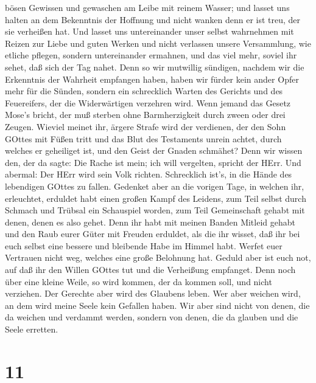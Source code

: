 bösen Gewissen und gewaschen am Leibe mit reinem Wasser; 
und lasset uns halten an dem Bekenntnis der Hoffnung und nicht wanken
denn er ist treu, der sie verheißen hat.  Und lasset uns
untereinander unser selbst wahrnehmen mit Reizen zur Liebe und guten
Werken  und nicht verlassen unsere Versammlung, wie etliche
pflegen, sondern untereinander ermahnen, und das viel mehr, soviel ihr
sehet, daß sich der Tag nahet.  Denn so wir mutwillig
sündigen, nachdem wir die Erkenntnis der Wahrheit empfangen haben, haben
wir fürder kein ander Opfer mehr für die Sünden,  sondern
ein schrecklich Warten des Gerichts und des Feuereifers, der die
Widerwärtigen verzehren wird.  Wenn jemand das Gesetz
Mose's bricht, der muß sterben ohne Barmherzigkeit durch zween oder drei
Zeugen.  Wieviel meinet ihr, ärgere Strafe wird der
verdienen, der den Sohn GOttes mit Füßen tritt und das Blut des
Testaments unrein achtet, durch welches er geheiliget ist, und den Geist
der Gnaden schmähet?  Denn wir wissen den, der da sagte:
Die Rache ist mein; ich will vergelten, spricht der HErr. Und abermal:
Der HErr wird sein Volk richten.  Schrecklich ist's, in die
Hände des lebendigen GOttes zu fallen.  Gedenket aber an
die vorigen Tage, in welchen ihr, erleuchtet, erduldet habt einen großen
Kampf des Leidens,  zum Teil selbst durch Schmach und
Trübsal ein Schauspiel worden, zum Teil Gemeinschaft gehabt mit denen,
denen es also gehet.  Denn ihr habt mit meinen Banden
Mitleid gehabt und den Raub eurer Güter mit Freuden erduldet, als die
ihr wisset, daß ihr bei euch selbst eine bessere und bleibende Habe im
Himmel habt.  Werfet euer Vertrauen nicht weg, welches eine
große Belohnung hat.  Geduld aber ist euch not, auf daß ihr
den Willen GOttes tut und die Verheißung empfanget.  Denn
noch über eine kleine Weile, so wird kommen, der da kommen soll, und
nicht verziehen.  Der Gerechte aber wird des Glaubens
leben. Wer aber weichen wird, an dem wird meine Seele kein Gefallen
haben.  Wir aber sind nicht von denen, die da weichen und
verdammt werden, sondern von denen, die da glauben und die Seele
erretten.

\hypertarget{section-9}{%
\section{11}\label{section-9}}

